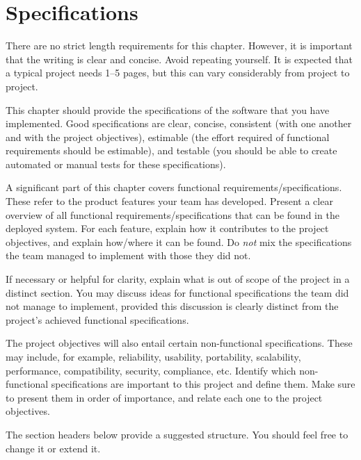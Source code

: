 \chapter{Specifications}
\label{chap:specifications}


\begin{length}
There are no strict length requirements for this chapter.  However, it is important that the writing is clear and concise.  Avoid repeating yourself.  It is expected that a typical project needs 1--5 pages, but this can vary considerably from project to project.
\end{length}

\begin{expectations}
This chapter should provide the specifications of the software that you have implemented.  Good specifications are clear, concise, consistent (with one another and with the project objectives), estimable (the effort required of functional requirements should be estimable), and testable (you should be able to create automated or manual tests for these specifications).

A significant part of this chapter covers functional requirements/specifications.  These refer to the product features your team has developed.  Present a clear overview of all functional requirements/specifications that can be found in the deployed system.  For each feature, explain how it contributes to the project objectives, and explain how/where it can be found.  Do \emph{not} mix the specifications the team managed to implement with those they did not.

If necessary or helpful for clarity, explain what is out of scope of the project in a distinct section.  You may discuss ideas for functional specifications the team did not manage to implement, provided this discussion is clearly distinct from the project's achieved functional specifications.

The project objectives will also entail certain non-functional specifications.  These may include, for example, reliability, usability, portability, scalability, performance, compatibility, security, compliance, etc.  Identify which non-functional specifications are important to this project and define them.  Make sure to present them in order of importance, and relate each one to the project objectives.

The section headers below provide a suggested structure.  You should feel free to change it or extend it.
\end{expectations}

